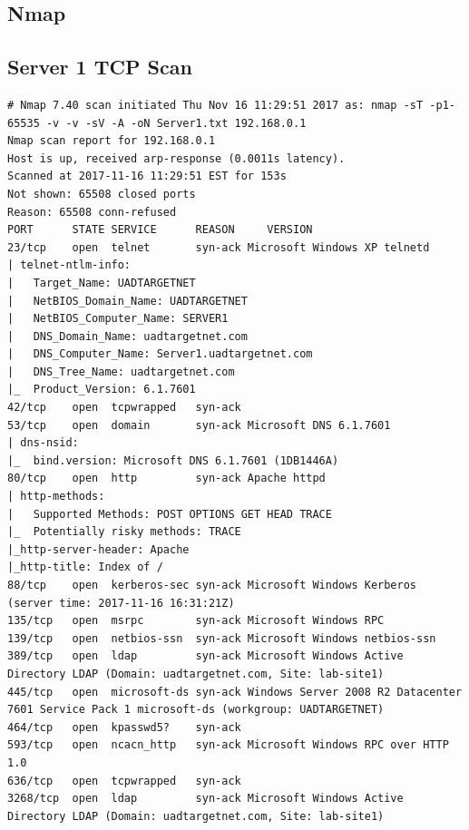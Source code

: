 \documentclass[12pt,a4paper]{article}
\renewcommand\thesection{\AlphAlph{\value{section}}}
\begin{document}
	 \clearpage

	\printglossary[title=Glossary,type=\acronymtype]


	\clearpage

	\begin{appendices}
		\renewcommand{\thesection}{\Roman{section}}
		\section{Nmap}
			\subsection{Server 1 TCP Scan}
				\begin{lstlisting}
# Nmap 7.40 scan initiated Thu Nov 16 11:29:51 2017 as: nmap -sT -p1-65535 -v -v -sV -A -oN Server1.txt 192.168.0.1
Nmap scan report for 192.168.0.1
Host is up, received arp-response (0.0011s latency).
Scanned at 2017-11-16 11:29:51 EST for 153s
Not shown: 65508 closed ports
Reason: 65508 conn-refused
PORT      STATE SERVICE      REASON  	VERSION
23/tcp    open  telnet       syn-ack Microsoft Windows XP telnetd
| telnet-ntlm-info:
|   Target_Name: UADTARGETNET
|   NetBIOS_Domain_Name: UADTARGETNET
|   NetBIOS_Computer_Name: SERVER1
|   DNS_Domain_Name: uadtargetnet.com
|   DNS_Computer_Name: Server1.uadtargetnet.com
|   DNS_Tree_Name: uadtargetnet.com
|_  Product_Version: 6.1.7601
42/tcp    open  tcpwrapped   syn-ack
53/tcp    open  domain       syn-ack Microsoft DNS 6.1.7601
| dns-nsid:
|_  bind.version: Microsoft DNS 6.1.7601 (1DB1446A)
80/tcp    open  http         syn-ack Apache httpd
| http-methods:
|   Supported Methods: POST OPTIONS GET HEAD TRACE
|_  Potentially risky methods: TRACE
|_http-server-header: Apache
|_http-title: Index of /
88/tcp    open  kerberos-sec syn-ack Microsoft Windows Kerberos (server time: 2017-11-16 16:31:21Z)
135/tcp   open  msrpc        syn-ack Microsoft Windows RPC
139/tcp   open  netbios-ssn  syn-ack Microsoft Windows netbios-ssn
389/tcp   open  ldap         syn-ack Microsoft Windows Active Directory LDAP (Domain: uadtargetnet.com, Site: lab-site1)
445/tcp   open  microsoft-ds syn-ack Windows Server 2008 R2 Datacenter 7601 Service Pack 1 microsoft-ds (workgroup: UADTARGETNET)
464/tcp   open  kpasswd5?    syn-ack
593/tcp   open  ncacn_http   syn-ack Microsoft Windows RPC over HTTP 1.0
636/tcp   open  tcpwrapped   syn-ack
3268/tcp  open  ldap         syn-ack Microsoft Windows Active Directory LDAP (Domain: uadtargetnet.com, Site: lab-site1)

\end{lstlisting}
\end{appendices}
\end{document}
